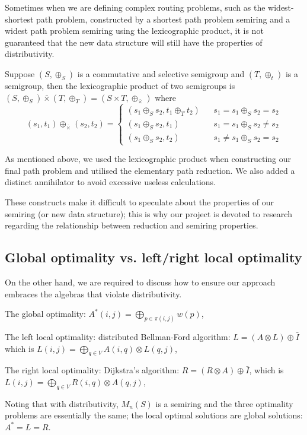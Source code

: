 \documentclass[a4paper,12pt,twoside,openright]{report}
\begin{document}
Sometimes when we are defining complex routing problems, such as the widest-shortest path problem, constructed by a shortest path problem semiring and a widest path problem semiring using the lexicographic product, it is not guaranteed that the new data structure will still have the properties of distributivity. 

Suppose $(S,\oplus_S)$ is a commutative and selective semigroup and $(T,\oplus_t)$ is a semigroup, then the lexicographic product of two semigroups is $(S,\oplus_S) \bar{\times} (T,\oplus_T) = (S\times T, \oplus_{\bar{\times}})$ where
\[(s_1,t_1) \oplus_{\bar{\times}} (s_2,t_2)=\left\{
\begin{array}{rcl}
(s_1\oplus_S s_2,t_1\oplus_T t_2)      &      & { s_1 = s_1 \oplus_S s_2 = s_2}\\
(s_1\oplus_S s_2,t_1)       &      & {s_1 = s_1 \oplus_S s_2 \neq s_2}\\
(s_1\oplus_S s_2,t_2)       &      & {s_1 \neq s_1 \oplus_S s_2 = s_2}
\end{array} \right.\]

As mentioned above, we used the lexicographic product when constructing our final path problem and utilised the elementary path reduction. We also added a distinct annihilator to avoid excessive useless calculations. 

These constructs make it difficult to speculate about the properties of our semiring (or new data structure); this is why our project is devoted to research regarding the relationship between reduction and semiring properties.

\subsection{Global optimality vs. left/right local optimality}
On the other hand, we are required to discuss how to ensure our approach embraces the algebras that violate distributivity.

The global optimality: $A^*(i,j) = \bigoplus_{p \in \pi (i,j)}w(p)$,

The left local optimality: distributed Bellman-Ford algorithm: $L = (A\otimes L) \oplus \bar{I}$ which is $L(i,j) = \bigoplus_{q \in V} A(i,q)\otimes L(q,j)$,

The right local optimality: Dijkstra's algorithm: $R = (R\otimes A) \oplus \bar{I}$, which is  $L(i,j) = \bigoplus_{q \in V} R(i,q)\otimes A(q,j)$,

Noting that with distributivity, $M_n(S)$ is a semiring and the three optimality problems are essentially the same; the local optimal solutions are global solutions: $A^* = L = R$.
\end{document}
